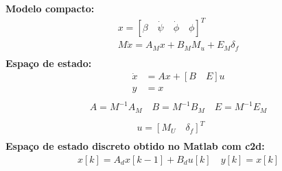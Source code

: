 \documentclass{beamer}
\begin{document}
 \begin{frame}[t]%

 \noindent\textbf{Modelo compacto:}
    \begin{equation*}
    \begin{split}
    x = [\beta \quad \dot\psi \quad \dot\phi \quad \phi]^T \\
	M\dot{x} = A_Mx + B_MM_u + E_M\delta_f\\
    \end{split}
    \end{equation*}
\vspace{-0.2 cm}
\noindent\textbf{Espaço de estado:} 
    \begin{equation*}
    \begin{split}
    	\dot{x} &= Ax + [B \quad E ] u \\
    	y &= x \\
   	\end{split}
    \end{equation*}
    \begin{equation*}
    \begin{split}
    	A = M^{-1}A_M  \quad B = M^{-1}B_M \quad E =  M^{-1}E_M   \\
    \end{split}
    \end{equation*}
    \begin{equation*}
    \begin{split}
    	u = [M_U \quad \delta_f]^T & &\\
    \end{split}
    \end{equation*}
    \noindent\textbf{Espaço de estado discreto obtido no Matlab com c2d:} 
    \begin{equation*}  
    \begin{split}
    	x[k] = A_dx[k-1] + B_du[k] \quad
    	y[k] = x[k] \\
    \end{split}
    \end{equation*}
    \end{frame}%
\end{document}

